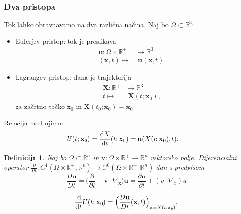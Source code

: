 \documentclass{beamer}
\newtheorem{definicija}{Definicija}
\newcommand{\R}{\mathbb R}
\newcommand{\bd}{\textbf}
\begin{document}
\begin{frame}
    \frametitle{Dva pristopa}
Tok lahko obravnavamo na dva različna načina. Naj bo $\Omega \subset \mathbb{R}^3$:
\begin{itemize}
    \pause
\item Eulerjev pristop: tok je preslikava
\begin{align*}
    \textbf{u}: \Omega \times \R^+ &\rightarrow \R^3 \\
    (\bd{x},t) \mapsto&\,\, \textbf{u}(\bd{x},t).
\end{align*}
\pause
\item Lagrangev pristop: dana je trajektorija 
\begin{align*}
    \bd{X}: \R^+& \rightarrow \R^3 \\
    t \mapsto&\,\, \bd{X}(t; \bd{x}_0),
\end{align*}
za začetno točko $\bd{x}_0$ in $\bd{X}(t_0; \bd{x}_0) = \bd{x}_0$
\end{itemize}
\end{frame}

\begin{frame}
Relacija med njima: 
\begin{align*}
    U(t;\bd{x}_0) = \frac{\dif X}{\dif t}&(t; \bd{x}_0) = \bd{u}(X(t; \bd{x}_0), t),
\end{align*}
\pause 
\begin{definicija}
    Naj bo $\Omega \subset \R^n$ in $\bd{v}: \Omega\times \R^+ \rightarrow \R^n$ vektorsko polje. Diferencialni operator 
    $\frac{D}{D t}: C^1(\Omega \times \R^+, \R^n) \rightarrow C^0(\Omega \times \R^+, \R^n)$ dan s predpisom
    \begin{equation}
        \frac{D \bd{u}}{Dt} = \Big(\frac{\partial}{\partial t} + \bd{v} \cdot \nabla_{\bd{x}}\Big) \bd{u} = \frac{\partial \bd{u}}{\partial t} + (v\cdot \nabla_x) u
    \end{equation}
\end{definicija}
\pause
\begin{equation}
    \frac{\dif}{\dif t} U(t; \bd{x}_0) = \Big(\frac{D \bd{u}}{Dt}(\bd{x}, t) \Big)_{\bd{x} = X(t; \bd{x}_0)},
\end{equation}
\end{frame}
\end{document}
